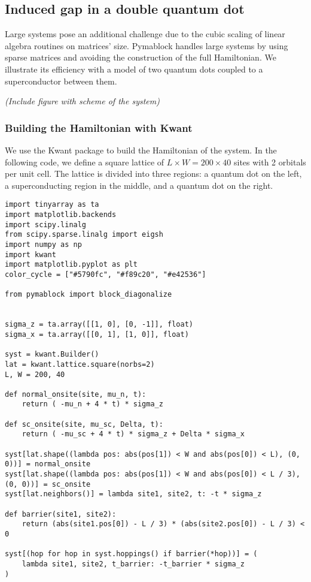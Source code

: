 \subsection{Induced gap in a double quantum dot}

Large systems pose an additional challenge due to the cubic scaling of linear algebra
routines on matrices' size.
Pymablock handles large systems by using sparse matrices and avoiding the
construction of the full Hamiltonian.
We illustrate its efficiency with a model of two quantum dots coupled to a
superconductor between them.

\textit{(Include figure with scheme of the system)}

\subsubsection{Building the Hamiltonian with Kwant}

We use the Kwant package \cite{Groth_2014} to build
the Hamiltonian of the system.
In the following code, we define a square lattice of $L \times W = 200 \times
40$ sites with 2 orbitals per unit cell.
The lattice is divided into three regions: a quantum dot on the left, a
superconducting region in the middle, and a quantum dot on the right.
%
\begin{verbatim}
import tinyarray as ta
import matplotlib.backends
import scipy.linalg
from scipy.sparse.linalg import eigsh
import numpy as np
import kwant
import matplotlib.pyplot as plt
color_cycle = ["#5790fc", "#f89c20", "#e42536"]

from pymablock import block_diagonalize


sigma_z = ta.array([[1, 0], [0, -1]], float)
sigma_x = ta.array([[0, 1], [1, 0]], float)

syst = kwant.Builder()
lat = kwant.lattice.square(norbs=2)
L, W = 200, 40

def normal_onsite(site, mu_n, t):
    return ( -mu_n + 4 * t) * sigma_z

def sc_onsite(site, mu_sc, Delta, t):
    return ( -mu_sc + 4 * t) * sigma_z + Delta * sigma_x

syst[lat.shape((lambda pos: abs(pos[1]) < W and abs(pos[0]) < L), (0, 0))] = normal_onsite
syst[lat.shape((lambda pos: abs(pos[1]) < W and abs(pos[0]) < L / 3), (0, 0))] = sc_onsite
syst[lat.neighbors()] = lambda site1, site2, t: -t * sigma_z

def barrier(site1, site2):
    return (abs(site1.pos[0]) - L / 3) * (abs(site2.pos[0]) - L / 3) < 0

syst[(hop for hop in syst.hoppings() if barrier(*hop))] = (
    lambda site1, site2, t_barrier: -t_barrier * sigma_z
)
\end{verbatim}


